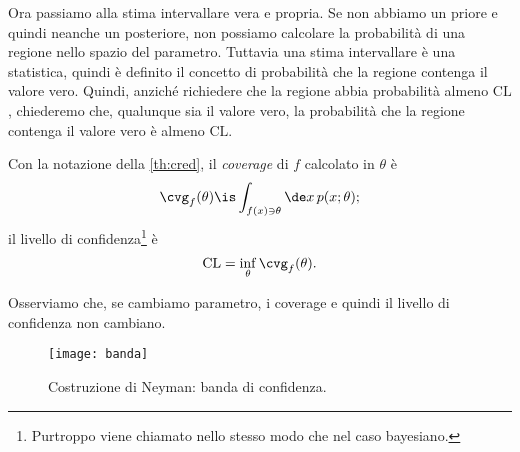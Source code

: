 

Ora passiamo alla stima intervallare vera e propria.
Se non abbiamo un priore e quindi neanche un posteriore,
non possiamo calcolare la probabilità di una regione nello spazio del parametro.
Tuttavia una stima intervallare è una statistica,
quindi è definito il concetto di probabilità che la regione contenga il valore vero.
Quindi, anziché richiedere che la regione abbia probabilità almeno $\mathrm{CL}$,
chiederemo che,
qualunque sia il valore vero,
la probabilità che la regione contenga il valore vero è almeno $\mathrm{CL}$.

\begin{definition}[Coverage]
	Con la notazione della \autoref{th:cred},
	il \emph{coverage} di $f$ calcolato in $\theta$ è
	\begin{equation*}
		\cvg_f(\theta)
		\is \int_{f(x)\ni\theta} \de x\, p(x;\theta);
	\end{equation*}
	il livello di confidenza\footnote{Purtroppo viene chiamato nello stesso modo che nel caso bayesiano.} è
	\begin{equation*}
		\mathrm{CL}
		= \inf_\theta \cvg_f(\theta).
	\end{equation*}
\end{definition}

Osserviamo che,
se cambiamo parametro,
i coverage e quindi il livello di confidenza non cambiano.

\begin{figure}
	\centering
	\texttt{[image: banda]}
	\caption{\label{fig:neyman}%
	Costruzione di Neyman: banda di confidenza.}
\end{figure}

